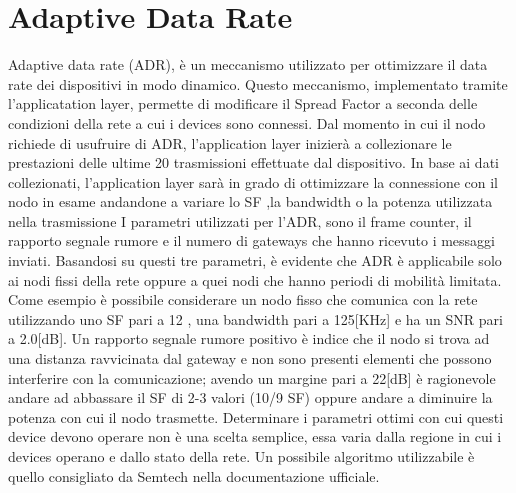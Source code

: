 \section{Adaptive Data Rate}
Adaptive data rate (ADR), è un meccanismo utilizzato per ottimizzare il data
rate dei dispositivi in modo dinamico. Questo meccanismo, implementato tramite
l'applicatation layer, permette di modificare il Spread Factor a seconda delle
condizioni della rete a cui i devices sono connessi. Dal momento in cui il nodo
richiede di usufruire di ADR, l'application layer inizierà a
collezionare le prestazioni delle ultime 20 trasmissioni effettuate dal
dispositivo.
In base ai dati collezionati, l'application layer sarà in grado di ottimizzare
la connessione con il nodo in esame andandone a variare lo SF ,la bandwidth o la
potenza utilizzata nella trasmissione I parametri utilizzati per l'ADR, 
sono il frame counter, il
rapporto segnale rumore e il numero di gateways che hanno ricevuto i messaggi
inviati.  Basandosi su questi tre parametri, è evidente che ADR è applicabile
solo ai nodi fissi della rete oppure a quei nodi che hanno periodi di mobilità
limitata.  Come esempio è possibile considerare un nodo fisso che comunica con
la rete utilizzando uno SF pari a 12 , una bandwidth pari a 125[KHz] e ha un SNR
pari a 2.0[dB]. Un rapporto segnale rumore positivo è indice che il nodo si
trova ad una distanza ravvicinata dal gateway e non sono presenti elementi che
possono interferire con la comunicazione; avendo un margine pari a 22[dB] è
ragionevole andare ad abbassare il SF di 2-3 valori (10/9 SF) oppure andare a
diminuire la potenza con cui il nodo trasmette. Determinare i parametri ottimi
con cui questi device devono operare non è una scelta semplice, essa varia dalla
regione in cui i devices operano e dallo stato della rete. Un possibile
algoritmo utilizzabile è quello consigliato da Semtech nella documentazione
ufficiale.


